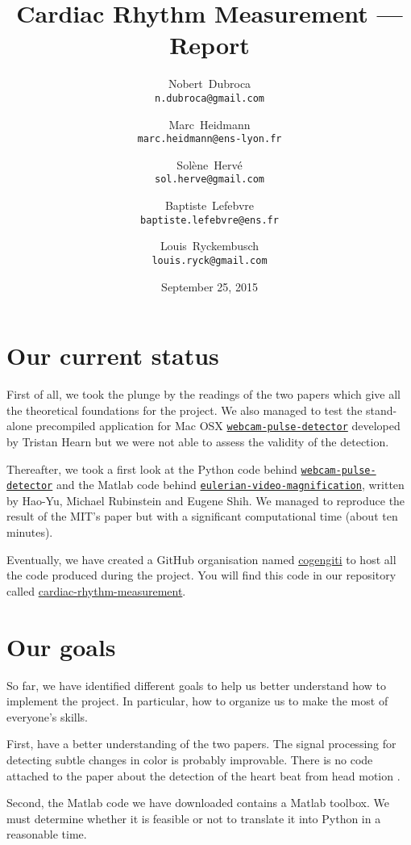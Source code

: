 \documentclass[a4paper]{article}
\title{Cardiac Rhythm Measurement --- Report}
\author{Nobert~Dubroca \\ \small{\texttt{n.dubroca@gmail.com}}
  \and Marc~Heidmann \\ \small{\texttt{marc.heidmann@ens-lyon.fr}}
  \and Sol\`{e}ne~Herv\'{e} \\ \small{\texttt{sol.herve@gmail.com}}
  \and Baptiste~Lefebvre \\ \small{\texttt{baptiste.lefebvre@ens.fr}}
  \and Louis~Ryckembusch \\ \small{\texttt{louis.ryck@gmail.com}}}
\date{September 25, 2015}
\begin{document}
\maketitle


\section*{Our current status}

First of all, we took the plunge by the readings of the two papers \cite{wu2012eulerian,balakrishnan2013detecting} which give all the theoretical foundations for the project. We also managed to test the stand-alone precompiled application for Mac OSX \href{https://github.com/thearn/webcam-pulse-detector}{\texttt{webcam-pulse-detector}} developed by Tristan Hearn but we were not able to assess the validity of the detection.

Thereafter, we took a first look at the Python code behind \href{https://github.com/thearn/webcam-pulse-detector}{\texttt{webcam-pulse-detector}} and the Matlab code behind \href{http://people.csail.mit.edu/mrub/evm/#code}{\texttt{eulerian-video-magnification}}, written by Hao-Yu, Michael Rubinstein and Eugene Shih. We managed to reproduce the result of the MIT's paper \cite{wu2012eulerian} but with a significant computational time (about ten minutes).

Eventually, we have created a GitHub organisation named \href{https://github.com/cogengiti}{cogengiti} to host all the code produced during the project. You will find this code in our repository called \href{https://github.com/cogengiti/cardiac-rhythm-measurement}{cardiac-rhythm-measurement}.


\section*{Our goals}

So far, we have identified different goals to help us better understand how to implement the project. In particular, how to organize us to make the most of everyone's skills.

First, have a better understanding of the two papers. The signal processing for detecting subtle changes in color is probably improvable. There is no code attached to the paper about the detection of the heart beat from head motion \cite{balakrishnan2013detecting}.

Second, the Matlab code we have downloaded contains a Matlab toolbox. We must determine whether it is feasible or not to translate it into Python in a reasonable time.
\end{document}
